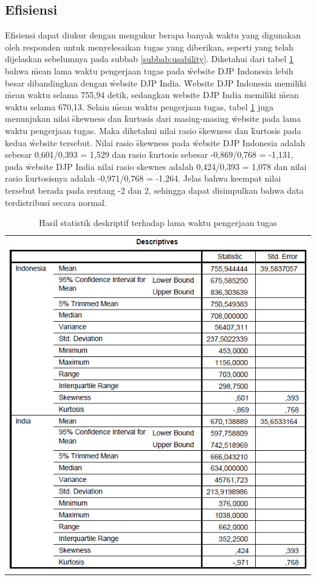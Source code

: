 \subsection{Efisiensi}
Efisiensi dapat diukur dengan mengukur berapa banyak waktu yang digunakan oleh responden untuk menyelesaikan tugas yang diberikan, seperti yang telah dijelaskan sebelumnya pada subbab \ref{subbab:usability}. Diketahui dari tabel \ref{tab:descwaktu} bahwa \f{mean} lama waktu pengerjaan tugas pada \f{website} DJP Indonesia lebih besar dibandingkan dengan \f{website} DJP India. \f{Website} DJP Indonesia memiliki \f{mean} waktu selama 755,94 detik, sedangkan website DJP India memiliki \f{mean} waktu selama 670,13. Selain \f{mean} waktu pengerjaan tugas, tabel \ref{tab:descwaktu} juga menunjukan nilai \f{skewness} dan \f{kurtosis} dari masing-masing \f{website} pada lama waktu pengerjaan tugas. Maka diketahui nilai rasio \f{skewness} dan \f{kurtosis} pada kedua \f{website} tersebut. Nilai rasio \f{skewness} pada \f{website} DJP Indonesia adalah sebesar 0,601/0,393 = 1,529 dan rasio \f{kurtosis} sebesar -0,869/0,768 = -1,131, pada \f{website} DJP India nilai rasio skewnes adalah 0,424/0,393 = 1,078 dan nilai rasio \f{kurtosis}nya adalah -0,971/0,768 = -1,264. Jelas bahwa keempat nilai tersebut berada pada rentang -2 dan 2, sehingga dapat disimpulkan bahwa data terdistribusi secara normal. 
\begin{table}
	\centering
	\caption{Hasil statistik deskriptif terhadap lama waktu pengerjaan tugas}
	\label{tab:descwaktu}
	\begin{tabular}{c}
		\includegraphics[width=\textwidth]
		{pics/waktudesc.PNG}
	\end{tabular}
\end{table}
